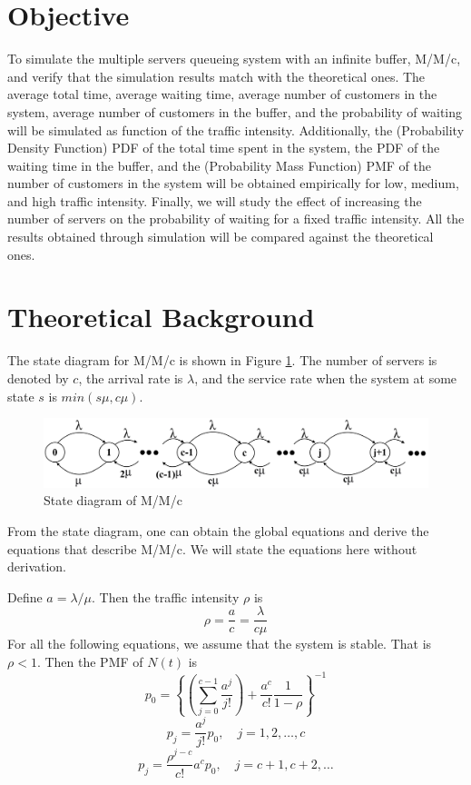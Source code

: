 \documentclass[12pt, a4paper]{article}
\begin{document}

\onehalfspacing

\section*{Objective}
To simulate the multiple servers queueing system with an infinite buffer, M/M/c, 
and verify that the simulation results match with the theoretical ones. 
The average total time, average waiting time, average number of customers in the system, 
average number of customers in the buffer, and the probability of waiting will 
be simulated as function of the traffic intensity. 
Additionally, the (Probability Density Function) PDF of the total time spent in the system, 
the PDF of the waiting time in the buffer, 
and the (Probability Mass Function) PMF of the number of customers in the system will 
be obtained empirically for low, medium, and high traffic intensity. Finally, we will 
study the effect of increasing the number of servers on the probability of waiting for a fixed
traffic intensity. All the results obtained through simulation will be compared against
the theoretical ones.

\section*{Theoretical Background}
The state diagram for M/M/c is shown in Figure \ref{state_diagram_MMc}. The 
number of servers is denoted by $c$, the arrival rate is $\lambda$, and the 
service rate when the system at some state $s$ is $min(s\mu, c\mu)$.

\begin{figure}[H]
  \centering 
  \includegraphics[width=430px]{images/MMc_state_diagram.png}
  \caption{State diagram of M/M/c}
  \label{state_diagram_MMc}
\end{figure}

From the state diagram, one can obtain the global equations and derive 
the equations that describe M/M/c. We will state the equations here without
derivation.

Define $a = \lambda / \mu$. Then the traffic intensity $\rho$ is 
\begin{equation}
  \rho = \frac{a}{c} = \frac{\lambda}{c \mu}
\end{equation}
For all the following equations, we assume that the system is stable. That is 
$\rho < 1$. Then the PMF of $N(t)$ is 
\begin{equation}
  p_0 = \left\{ 
    \left( \sum_{j=0}^{c-1} \frac{a^j}{j!} \right)  
    + \frac{a^c}{c!} \frac{1}{1 - \rho}
    \right\}^{-1}
\end{equation}
\begin{equation}
  p_j = \frac{a^j}{j!} p_0, \quad j = 1, 2, \dots, c
\end{equation}
\begin{equation}
  p_j = \frac{\rho^{j-c}}{c!} a^c p_0, \quad j = c+1, c+2, \dots 
\end{equation}
\end{document}
